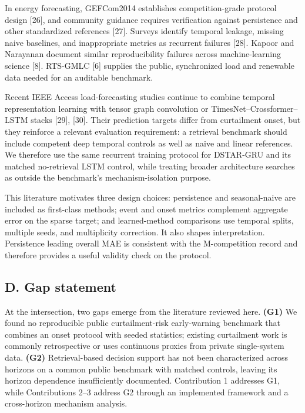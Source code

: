 \documentclass[
  10pt,
  a4paper,
]{article}
\begin{document}
In energy forecasting, GEFCom2014 establishes competition-grade protocol
design {[}26{]}, and community guidance requires verification against
persistence and other standardized references {[}27{]}. Surveys identify
temporal leakage, missing naive baselines, and inappropriate metrics as
recurrent failures {[}28{]}. Kapoor and Narayanan document similar
reproducibility failures across machine-learning science {[}8{]}.
RTS-GMLC {[}6{]} supplies the public, synchronized load and renewable
data needed for an auditable benchmark.

Recent IEEE Access load-forecasting studies continue to combine temporal
representation learning with tensor graph convolution or
TimesNet--Crossformer--LSTM stacks {[}29{]}, {[}30{]}. Their prediction
targets differ from curtailment onset, but they reinforce a relevant
evaluation requirement: a retrieval benchmark should include competent
deep temporal controls as well as naive and linear references. We
therefore use the same recurrent training protocol for DSTAR-GRU and its
matched no-retrieval LSTM control, while treating broader architecture
searches as outside the benchmark's mechanism-isolation purpose.

This literature motivates three design choices: persistence and
seasonal-naive are included as first-class methods; event and onset
metrics complement aggregate error on the sparse target; and
learned-method comparisons use temporal splits, multiple seeds, and
multiplicity correction. It also shapes interpretation. Persistence
leading overall MAE is consistent with the M-competition record and
therefore provides a useful validity check on the protocol.

\subsection{D. Gap statement}\label{d.-gap-statement}

At the intersection, two gaps emerge from the literature reviewed here.
\textbf{(G1)} We found no reproducible public curtailment-risk
early-warning benchmark that combines an onset protocol with seeded
statistics; existing curtailment work is commonly retrospective or uses
continuous proxies from private single-system data. \textbf{(G2)}
Retrieval-based decision support has not been characterized across
horizons on a common public benchmark with matched controls, leaving its
horizon dependence insufficiently documented. Contribution 1 addresses
G1, while Contributions 2--3 address G2 through an implemented framework
and a cross-horizon mechanism analysis.
\end{document}

